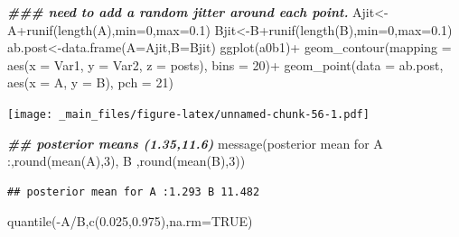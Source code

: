 \documentclass[
]{book}
\newenvironment{Shaded}{\begin{snugshade}}{\end{snugshade}}
\newcommand{\AttributeTok}[1]{\textcolor[rgb]{0.77,0.63,0.00}{#1}}
\newcommand{\ConstantTok}[1]{\textcolor[rgb]{0.00,0.00,0.00}{#1}}
\newcommand{\DecValTok}[1]{\textcolor[rgb]{0.00,0.00,0.81}{#1}}
\newcommand{\DocumentationTok}[1]{\textcolor[rgb]{0.56,0.35,0.01}{\textbf{\textit{#1}}}}
\newcommand{\FloatTok}[1]{\textcolor[rgb]{0.00,0.00,0.81}{#1}}
\newcommand{\FunctionTok}[1]{\textcolor[rgb]{0.00,0.00,0.00}{#1}}
\newcommand{\NormalTok}[1]{#1}
\newcommand{\OtherTok}[1]{\textcolor[rgb]{0.56,0.35,0.01}{#1}}
\newcommand{\SpecialCharTok}[1]{\textcolor[rgb]{0.00,0.00,0.00}{#1}}
\newcommand{\StringTok}[1]{\textcolor[rgb]{0.31,0.60,0.02}{#1}}
\theoremstyle{definition}
\theoremstyle{definition}
\theoremstyle{definition}
\theoremstyle{definition}
\theoremstyle{remark}
\begin{document}
\begin{Shaded}
\begin{Highlighting}[]
    \DocumentationTok{\#\#\# need to add a random jitter around each point.}
\NormalTok{    Ajit}\OtherTok{\textless{}{-}}\NormalTok{A}\SpecialCharTok{+}\FunctionTok{runif}\NormalTok{(}\FunctionTok{length}\NormalTok{(A),}\AttributeTok{min=}\DecValTok{0}\NormalTok{,}\AttributeTok{max=}\FloatTok{0.1}\NormalTok{)}
\NormalTok{    Bjit}\OtherTok{\textless{}{-}}\NormalTok{B}\SpecialCharTok{+}\FunctionTok{runif}\NormalTok{(}\FunctionTok{length}\NormalTok{(B),}\AttributeTok{min=}\DecValTok{0}\NormalTok{,}\AttributeTok{max=}\FloatTok{0.1}\NormalTok{)}
\NormalTok{   ab.post}\OtherTok{\textless{}{-}}\FunctionTok{data.frame}\NormalTok{(}\AttributeTok{A=}\NormalTok{Ajit,}\AttributeTok{B=}\NormalTok{Bjit)}
 \FunctionTok{ggplot}\NormalTok{(a0b1)}\SpecialCharTok{+}
 \FunctionTok{geom\_contour}\NormalTok{(}\AttributeTok{mapping =} \FunctionTok{aes}\NormalTok{(}\AttributeTok{x =}\NormalTok{ Var1, }\AttributeTok{y =}\NormalTok{ Var2, }\AttributeTok{z =}\NormalTok{ posts), }\AttributeTok{bins =} \DecValTok{20}\NormalTok{)}\SpecialCharTok{+}
  \FunctionTok{geom\_point}\NormalTok{(}\AttributeTok{data =}\NormalTok{ ab.post, }\FunctionTok{aes}\NormalTok{(}\AttributeTok{x =}\NormalTok{ A, }\AttributeTok{y =}\NormalTok{ B), }\AttributeTok{pch =} \DecValTok{21}\NormalTok{)}
\end{Highlighting}
\end{Shaded}

\texttt{[image: \_main\_files/figure-latex/unnamed-chunk-56-1.pdf]}

\begin{Shaded}
\begin{Highlighting}[]
 \DocumentationTok{\#\# posterior means (1.35,11.6)}
 \FunctionTok{message}\NormalTok{(}\StringTok{\textquotesingle{}posterior mean for A :\textquotesingle{}}\NormalTok{,}\FunctionTok{round}\NormalTok{(}\FunctionTok{mean}\NormalTok{(A),}\DecValTok{3}\NormalTok{),}\StringTok{\textquotesingle{} B \textquotesingle{}}\NormalTok{,}\FunctionTok{round}\NormalTok{(}\FunctionTok{mean}\NormalTok{(B),}\DecValTok{3}\NormalTok{))}
\end{Highlighting}
\end{Shaded}

\begin{verbatim}
## posterior mean for A :1.293 B 11.482
\end{verbatim}

\begin{Shaded}
\begin{Highlighting}[]
 \FunctionTok{quantile}\NormalTok{(}\SpecialCharTok{{-}}\NormalTok{A}\SpecialCharTok{/}\NormalTok{B,}\FunctionTok{c}\NormalTok{(}\FloatTok{0.025}\NormalTok{,}\FloatTok{0.975}\NormalTok{),}\AttributeTok{na.rm=}\ConstantTok{TRUE}\NormalTok{)}
\end{Highlighting}
\end{Shaded}
\end{document}
